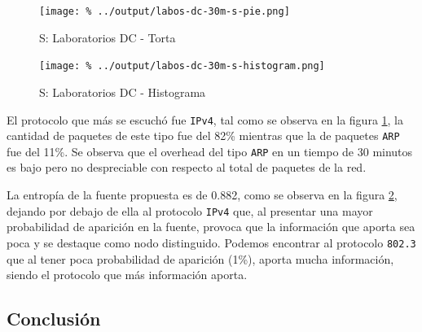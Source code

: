 \documentclass[final,inline,a4paper,narroweqnarray]{ieee}
\begin{document}
    \begin{figure}[ht]\begin{center}
      \texttt{[image: \%
      ../output/labos-dc-30m-s-pie.png]}
      \vspace{-3em}
      \caption{S: Laboratorios DC - Torta}
      \label{labos-dc-30m-s-pie}
    \end{center}\end{figure}

    \begin{figure}[ht]\begin{center}
      \texttt{[image: \%
      ../output/labos-dc-30m-s-histogram.png]}
      \caption{S: Laboratorios DC - Histograma}
      \label{labos-dc-30m-s-histogram}
    \end{center}\end{figure}


  El protocolo que más se escuchó fue \texttt{IPv4}, tal como se
  observa en la figura \ref{labos-dc-30m-s-pie}, la cantidad de
  paquetes  de este tipo fue del 82\% mientras que la de paquetes
  \texttt{ARP} fue del 11\%. Se observa que el overhead del tipo \texttt{ARP} 
  en un tiempo de 30 minutos es bajo pero no despreciable con respecto al 
  total de paquetes de la red.

  La entropía de la fuente propuesta es de 0.882, como se observa en la
  figura \ref{labos-dc-30m-s-histogram}, dejando por debajo de ella al
  protocolo \texttt{IPv4} que, al presentar una mayor probabilidad de
  aparición en la fuente, provoca que la información que aporta sea
  poca y se destaque como nodo distinguido. Podemos encontrar al protocolo 
  \texttt{802.3} que al tener poca probabilidad de aparición
  (1\%), aporta mucha información, siendo el protocolo que más información
  aporta.

    \subsection{Conclusión}
\end{document}
